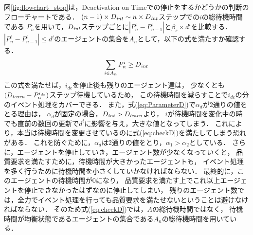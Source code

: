 \documentclass[12pt,a4j,twoside]{jarticle}
\def\AgentSet{A}
\def\DeactCheckInterval{D_{\it int}}
\def\DeactLearnInterval{D_{\it learn}}
\begin{document}
  図\ref{fig:flowchart_stop}は，Deactivation on Timeでの停止をするかどうかの判断のフローチャートである．
  $(n-1) \times \DeactCheckInterval \sim n \times \DeactCheckInterval$ステップでの$i$の総待機時間である
  $P^i_n$を用いて，$\DeactCheckInterval$ステップごとに$|P^i_n - P^i_{n-1}|$と$\beta_s \times d^i$を比較する．
  $|P^i_n - P^i_{n-1}| \leq d^i$のエージェントの集合を$A_n$として，以下の式を満たすか確認する．
  \begin{equation}\label{eq:checkD}
    \sum_{i \in A_n} P^i_n \geq \DeactCheckInterval
  \end{equation}
  この式を満たせば，$i_{de}$を停止後も残りのエージェント達は，
  少なくとも$(\DeactLearnInterval-P^{i_{de}}_n)$ステップ待機しているため，
  この待機時間を減らすことで$i_{de}$の分のイベント処理をカバーできる．
  また，式(\ref{eq:ParameterD})で$\alpha_d$が2通りの値をとる理由は，
  $\alpha_d$が固定の場合，$\DeactCheckInterval > \DeactLearnInterval$より，
  $i$が待機時間を変化中の時でも直前の数回の更新で$d^i$に影響を与え，大きな値となってしまう．
  これにより，本当は待機時間を変更させているのに式(\ref{eq:checkD})を満たしてしまう恐れがある．
  これを防ぐために，$\alpha_d$は2通りの値をとり，$\alpha_1 > \alpha_2$としている．
  さらに，エージェントを停止していき，エージェント数が少なくなっていくと，
  品質要求を満たすために，待機時間が大きかったエージェントも，
  イベント処理を多く行うために待機時間を小さくしていかなければならない．
  最終的に，このエージェントの待機時間が0になり，
  品質要求を満たす上でこれ以上エージェントを停止できなかったはずなのに停止してしまい，
  残りのエージェント数では，全力でイベント処理を行っても品質要求を満たせないということは避けなければならない．
  そのため式(\ref{eq:checkD})では，$\AgentSet$の総待機時間ではなく，
  待機時間が均衡状態であるエージェントの集合である$A_n$の総待機時間を用いている．
  \par
\end{document}

